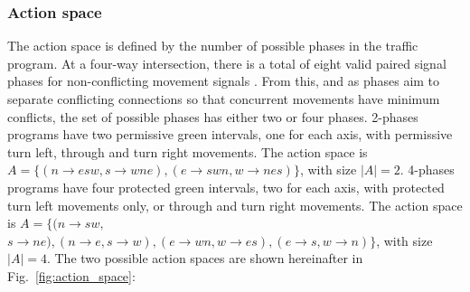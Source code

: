 \documentclass[journal]{IEEEtran}
\begin{document}
\subsubsection{Action space}
The action space is defined by the number of possible phases in the traffic program. At a four-way intersection, there is a total of eight valid paired signal phases for non-conflicting movement signals \cite{wei2020survey}. From this, and as phases aim to separate conflicting connections so that concurrent movements have minimum conflicts, the set of possible phases has either two or four phases. 2-phases programs have two permissive green intervals, one for each axis, with permissive turn left, through and turn right movements. The action space is $A=\{(n\rightarrow esw,s\rightarrow wne),(e\rightarrow swn,w\rightarrow nes)\}$, with size $|A|=2$. 4-phases programs have four protected green intervals, two for each axis, with protected turn left movements only, or through and turn right movements. The action space is $A=\{(n\rightarrow sw,$ $s\rightarrow ne),(n\rightarrow e,s\rightarrow w),(e\rightarrow wn,w\rightarrow es),(e\rightarrow s,w\rightarrow n)\}$, with size $|A|=4$.
The two possible action spaces are shown hereinafter in Fig.~\ref{fig:action_space}:
\end{document}
